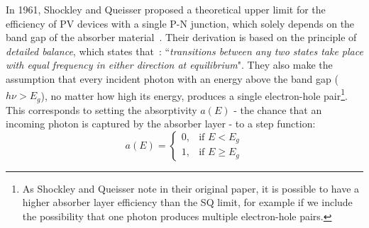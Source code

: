 \begin{refsection}
In 1961, Shockley and Queisser proposed a theoretical upper limit for the 
efficiency of \gls{PV} devices with a single P-N junction, which solely depends on 
the band gap of the absorber material~\cite{Shockley1961}. Their derivation is 
based on the principle of \textit{detailed balance}, which states 
that~\cite{Klein1955}: ``\textit{transitions between any two states take place 
with equal frequency in either direction at equilibrium}". They also make the 
assumption that every incident photon with an energy above the band gap ($h\nu 
> E_g$), no matter how high its energy, produces a single electron-hole 
pair\footnote{As Shockley and Queisser note in their original paper, it is 
possible to have a higher absorber layer efficiency than the \gls{SQ} limit, for 
example if we include the possibility that one photon produces multiple 
electron-hole pairs.}. This corresponds to setting the absorptivity $a(E)$ - 
the chance that an incoming photon is captured by the absorber layer - to a 
step function: 
\begin{equation}\label{slme:eq-step_a} 
a(E) =  \begin{cases} 0, & \mbox{if } E < E_g \\ 1, & \mbox{if } E \geq E_g 
\end{cases} 
\end{equation} 
 

\end{refsection}

